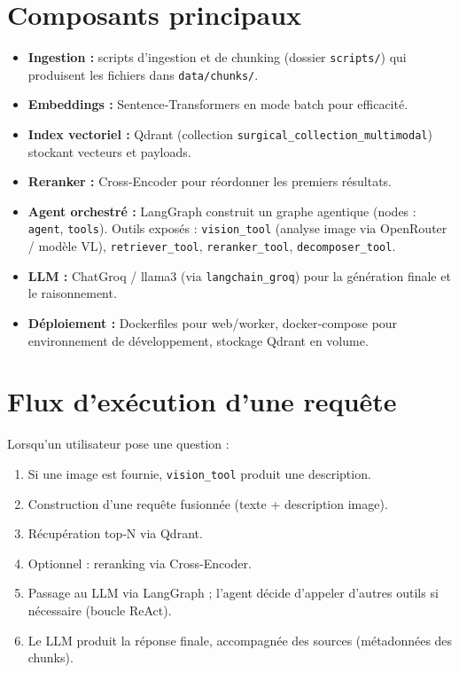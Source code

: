 \documentclass[12pt,a4paper]{report}
\begin{document}
\section{Composants principaux}
\begin{itemize}
  \item \textbf{Ingestion :} scripts d'ingestion et de chunking (dossier \texttt{scripts/}) qui produisent les fichiers dans \texttt{data/chunks/}.
  \item \textbf{Embeddings :} Sentence‑Transformers en mode batch pour efficacité.
  \item \textbf{Index vectoriel :} Qdrant (collection \texttt{surgical\_collection\_multimodal}) stockant vecteurs et payloads.
  \item \textbf{Reranker :} Cross‑Encoder pour réordonner les premiers résultats.
  \item \textbf{Agent orchestré :} LangGraph construit un graphe agentique (nodes : \texttt{agent}, \texttt{tools}). Outils exposés : \texttt{vision\_tool} (analyse image via OpenRouter / modèle VL), \texttt{retriever\_tool}, \texttt{reranker\_tool}, \texttt{decomposer\_tool}.
  \item \textbf{LLM :} ChatGroq / llama3 (via \texttt{langchain\_groq}) pour la génération finale et le raisonnement.
  \item \textbf{Déploiement :} Dockerfiles pour web/worker, docker‑compose pour environnement de développement, stockage Qdrant en volume.
\end{itemize}

\section{Flux d'exécution d'une requête}
Lorsqu'un utilisateur pose une question :
\begin{enumerate}
  \item Si une image est fournie, \texttt{vision\_tool} produit une description. 
  \item Construction d'une requête fusionnée (texte + description image).
  \item Récupération top‑N via Qdrant.
  \item Optionnel : reranking via Cross‑Encoder.
  \item Passage au LLM via LangGraph ; l'agent décide d'appeler d'autres outils si nécessaire (boucle ReAct).
  \item Le LLM produit la réponse finale, accompagnée des sources (métadonnées des chunks).
\end{enumerate}
\end{document}

